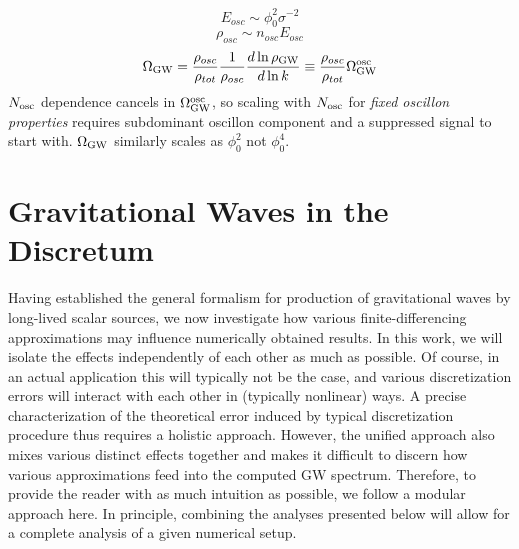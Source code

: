 \documentclass{revtex4}
\begin{document}

\begin{equation}
  E_{osc} \sim \phi_0^2\sigma^{-2}
\end{equation}
\begin{equation}
  \rho_{osc} \sim n_{osc}E_{osc}
\end{equation}
\begin{equation}
  \Omega_{\rm GW} = \frac{\rho_{osc}}{\rho_{tot}}\frac{1}{\rho_{osc}}\frac{d\ln\rho_{\rm GW}}{d\ln k} \equiv \frac{\rho_{osc}}{\rho_{tot}}\Omega_{\rm GW}^{{\rm osc}}
\end{equation}
$N_{\rm osc}$ dependence cancels in $\Omega_{\rm GW}^{\rm osc}$, so scaling with $N_{\rm osc}$ for \emph{fixed oscillon properties} requires subdominant oscillon component and a suppressed signal to start with.
$\Omega_{\rm GW}$ similarly scales as $\phi_0^2$ not $\phi_0^4$.

\section{Gravitational Waves in the Discretum}
Having established the general formalism for production of gravitational waves by long-lived scalar sources, we now investigate how various finite-differencing approximations may influence numerically obtained results.
In this work, we will isolate the effects independently of each other as much as possible.
Of course, in an actual application this will typically not be the case, and various discretization errors will interact with each other in (typically nonlinear) ways.
A precise characterization of the theoretical error induced by typical discretization procedure thus requires a holistic approach.
However, the unified approach also mixes various distinct effects together and makes it difficult to discern how various approximations feed into the computed GW spectrum.
Therefore, to provide the reader with as much intuition as possible, we follow a modular approach here.
In principle, combining the analyses presented below will allow for a complete analysis of a given numerical setup.
\end{document}

